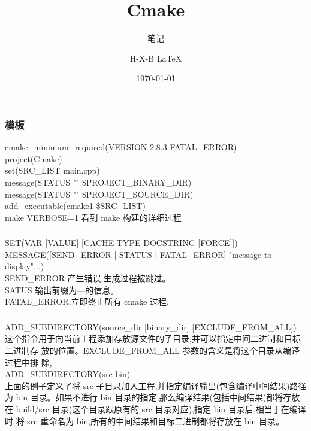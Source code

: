 \documentclass{beamer}
\begin{document}
\begin{CJK}{UTF8}{gkai}

  \title{Cmake}
  \subtitle{笔记}
  \author{H-X-B \LaTeX{} }
  \date{\today}

  \frame{\titlepage}

  \begin{frame}\frametitle{模板}
    cmake\_minimum\_required(VERSION 2.8.3 FATAL\_ERROR)\\
    project(Cmake)\\
    set(SRC\_LIST main.cpp)\\
    message(STATUS "" \${PROJECT\_BINARY\_DIR})\\
    message(STATUS "" \${PROJECT\_SOURCE\_DIR})\\
    add\_executable(cmake1 \${SRC\_LIST})\\
    make VERBOSE=1 看到 make 构建的详细过程
  \end{frame}

  \begin{frame}\frametitle{}
    SET(VAR [VALUE] [CACHE TYPE DOCSTRING [FORCE]])\\
    MESSAGE([SEND\_ERROR | STATUS | FATAL\_ERROR] "message to
    display"...)\\
    SEND\_ERROR 产生错误,生成过程被跳过。\\
    SATUS 输出前缀为—的信息。\\
    FATAL\_ERROR,立即终止所有 cmake 过程.
  \end{frame}

  \begin{frame}\frametitle{}
    ADD\_SUBDIRECTORY(source\_dir [binary\_dir] [EXCLUDE\_FROM\_ALL])\\
    这个指令用于向当前工程添加存放源文件的子目录,并可以指定中间二进制和目标二进制存
    放的位置。EXCLUDE\_FROM\_ALL 参数的含义是将这个目录从编译过程中排
    除,\\
    ADD\_SUBDIRECTORY(src bin)\\
    上面的例子定义了将 src 子目录加入工程,并指定编译输出(包含编译中间结果)路径为
    bin 目录。如果不进行 bin 目录的指定,那么编译结果(包括中间结果)都将存放在
    build/src 目录(这个目录跟原有的 src 目录对应),指定 bin 目录后,相当于在编译时
    将 src 重命名为 bin,所有的中间结果和目标二进制都将存放在 bin 目录。
  \end{frame}


\end{CJK}
\end{document}
